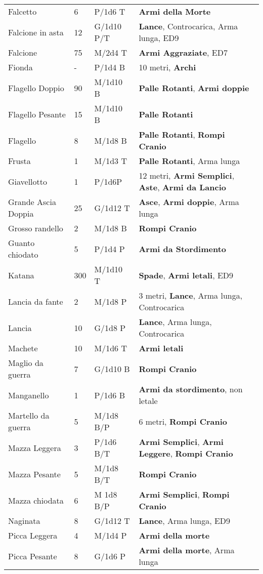 \documentclass[a4paper,12 pt,openany]{book}
\begin{document}
\begin{textblock*}{19.5cm}
\begin{tabularx}{0.95\textwidth}{llll}
Falcetto& 6& P/1d6 T& \textbf{Armi della Morte}\\
Falcione in asta& 12 & G/1d10 P/T& \textbf{Lance}, Controcarica, Arma lunga, ED9\\
Falcione& 75 & M/2d4 T& \textbf{Armi Aggraziate}, ED7\\
Fionda& -& P/1d4 B& 10 metri, \textbf{Archi}\\
Flagello Doppio& 90 & M/1d10 B& \textbf{Palle Rotanti}, \textbf{Armi doppie}\\
Flagello Pesante& 15 & M/1d10 B& \textbf{Palle Rotanti}\\
Flagello& 8& M/1d8 B& \textbf{Palle Rotanti}, \textbf{Rompi Cranio}\\
Frusta& 1& M/1d3 T& \textbf{Palle Rotanti}, Arma lunga\\
Giavellotto& 1& P/1d6P& 12 metri,  \textbf{Armi Semplici}, \textbf{Aste}, \textbf{Armi da Lancio}\\
Grande Ascia Doppia& 25 & G/1d12 T& \textbf{Asce}, \textbf{Armi doppie}, Arma lunga\\
Grosso randello& 2& M/1d8 B&\textbf{Rompi Cranio}\\
Guanto chiodato& 5& P/1d4 P&\textbf{Armi da Stordimento}\\
Katana& 300& M/1d10 T& \textbf{Spade}, \textbf{Armi letali}, ED9\\
Lancia da fante& 2& M/1d8 P&3 metri, \textbf{Lance}, Arma lunga, Controcarica\\
Lancia& 10 & G/1d8 P&\textbf{Lance}, Arma lunga, Controcarica\\
Machete& 10 & M/1d6 T&\textbf{Armi letali}\\
Maglio da guerra& 7& G/1d10 B& \textbf{Rompi Cranio}\\
Manganello& 1& P/1d6 B& \textbf{Armi da stordimento}, non letale\\
Martello da guerra& 5& M/1d8 B/P& 6 metri, \textbf{Rompi Cranio}\\
Mazza Leggera& 3& P/1d6 B/T& \textbf{Armi Semplici}, \textbf{Armi Leggere}, \textbf{Rompi Cranio} \\
Mazza Pesante& 5& M/1d8 B/T& \textbf{Rompi Cranio}\\
Mazza chiodata& 6& M 1d8 B/P& \textbf{Armi Semplici}, \textbf{Rompi Cranio}\\
Naginata& 8& G/1d12 T&\textbf{Lance}, Arma lunga, ED9\\
Picca Leggera& 4& M/1d4 P&\textbf{Armi della morte}\\
Picca Pesante& 8& G/1d6 P&\textbf{Armi della morte}, Arma lunga\\

\end{tabularx}
\end{textblock*}
\end{document}
